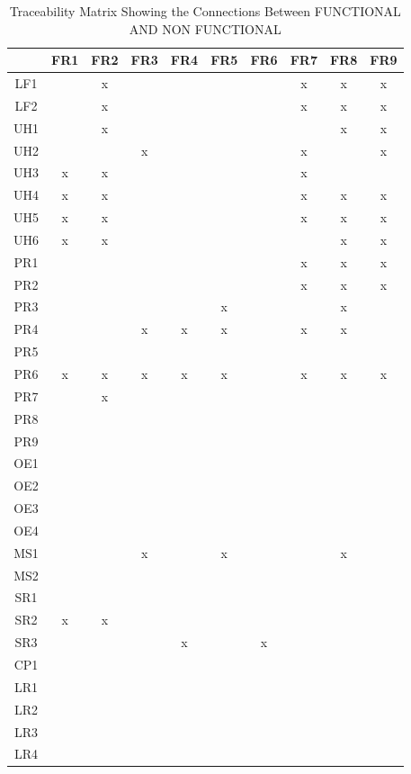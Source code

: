 \documentclass[12pt]{article}
\begin{document}
{\begin{table}[h!]
\centering
\begin{tabular}{|c|c|c|c|c|c|c|c|c|c|}
\hline
   &FR1& FR2&FR3&FR4&FR5&FR6&FR7&FR8&FR9\\ \hline
LF1& & x& & & & & x& x& x \\ \hline
LF2& & x& & & & & x& x& x \\ \hline
UH1& & x& & & & & & x& x \\ \hline
UH2& & & x& & & & x& & x \\ \hline
UH3& x& x& & & & & x& &  \\ \hline
UH4& x& x& & & & & x& x& x\\ \hline
UH5& x& x& & & & & x& x& x\\ \hline
UH6& x& x& & & & & & x& x\\ \hline
PR1& & & & & & & x& x& x\\ \hline
PR2& & & & & & & x& x& x\\ \hline
PR3& & & & & x& & & x& \\ \hline
PR4& & & x& x& x& & x& x& \\ \hline
PR5& & & & & & & & & \\ \hline
PR6& x& x& x& x& x& & x& x& x\\ \hline
PR7& & x& & & & & & & \\ \hline
PR8& & & & & & & & & \\ \hline
PR9& & & & & & & & &\\ \hline
OE1& & & & & & & & &\\ \hline
OE2& & & & & & & & &\\ \hline
OE3& & & & & & & & &\\ \hline
OE4& & & & & & & & &\\ \hline
MS1& & & x& & x& & & x&\\ \hline
MS2& & & & & & & & & \\ \hline
SR1& & & & & & & & & \\ \hline
SR2& x& x& & & & & & & \\ \hline
SR3& & & & x& & x& & & \\ \hline
CP1& & & & & & & & & \\ \hline
LR1& & & & & & & & & \\ \hline
LR2& & & & & & & & & \\ \hline
LR3& & & & & & & & & \\ \hline
LR4& & & & & & & & & \\ \hline
\end{tabular}
\caption{Traceability Matrix Showing the Connections Between FUNCTIONAL AND NON FUNCTIONAL}
\label{Table:A_trace}
\end{table}

}
\end{document}
